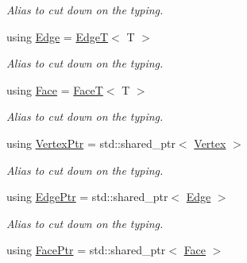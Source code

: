 \begin{DoxyCompactItemize}
\begin{DoxyCompactList}\small\item\em Alias to cut down on the typing. \end{DoxyCompactList}\item 
\mbox{\label{classDcel_1_1MeshT_a94f5c42e6f80fd948ebbc294d948ffab}} 
using \hyperlink{classDcel_1_1MeshT_a94f5c42e6f80fd948ebbc294d948ffab}{Edge} = \hyperlink{classDcel_1_1EdgeT}{EdgeT}$<$ T $>$
\begin{DoxyCompactList}\small\item\em Alias to cut down on the typing. \end{DoxyCompactList}\item 
\mbox{\label{classDcel_1_1MeshT_ac1fcce96c65811660619af9eb32589f9}} 
using \hyperlink{classDcel_1_1MeshT_ac1fcce96c65811660619af9eb32589f9}{Face} = \hyperlink{classDcel_1_1FaceT}{FaceT}$<$ T $>$
\begin{DoxyCompactList}\small\item\em Alias to cut down on the typing. \end{DoxyCompactList}\item 
\mbox{\label{classDcel_1_1MeshT_a1e0abeadcb51e679b0dd9a36e2ee08c7}} 
using \hyperlink{classDcel_1_1MeshT_a1e0abeadcb51e679b0dd9a36e2ee08c7}{Vertex\+Ptr} = std\+::shared\+\_\+ptr$<$ \hyperlink{classDcel_1_1MeshT_a58b357c4ad94f4a4b813ed7ebf01cd05}{Vertex} $>$
\begin{DoxyCompactList}\small\item\em Alias to cut down on the typing. \end{DoxyCompactList}\item 
\mbox{\label{classDcel_1_1MeshT_ab2b035530536a8bc56e40aab455f24e3}} 
using \hyperlink{classDcel_1_1MeshT_ab2b035530536a8bc56e40aab455f24e3}{Edge\+Ptr} = std\+::shared\+\_\+ptr$<$ \hyperlink{classDcel_1_1MeshT_a94f5c42e6f80fd948ebbc294d948ffab}{Edge} $>$
\begin{DoxyCompactList}\small\item\em Alias to cut down on the typing. \end{DoxyCompactList}\item 
\mbox{\label{classDcel_1_1MeshT_a6c71642a9e6b36f9d6ab6027035625f0}} 
using \hyperlink{classDcel_1_1MeshT_a6c71642a9e6b36f9d6ab6027035625f0}{Face\+Ptr} = std\+::shared\+\_\+ptr$<$ \hyperlink{classDcel_1_1MeshT_ac1fcce96c65811660619af9eb32589f9}{Face} $>$

\end{DoxyCompactItemize}
